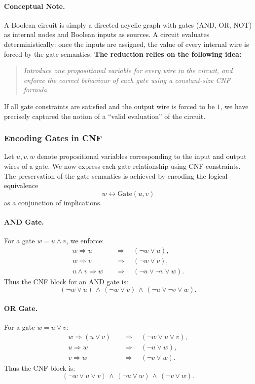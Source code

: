 \documentclass[9pt]{extarticle}
\begin{document}
\paragraph{Conceptual Note.}
A Boolean circuit is simply a directed acyclic graph with gates
(\textsc{AND}, \textsc{OR}, \textsc{NOT}) as internal nodes and Boolean inputs
as sources.  A circuit evaluates deterministically: once the inputs are
assigned, the value of every internal wire is forced by the gate semantics.
\textbf{The reduction relies on the following idea:}
\begin{quote}
    \emph{Introduce one propositional variable for every wire in the circuit, and
    enforce the correct behaviour of each gate using a constant-size CNF
    formula.}
\end{quote}
If all gate constraints are satisfied and the output wire is forced to be $1$,
we have precisely captured the notion of a ``valid evaluation'' of the circuit.

\subsubsection*{Encoding Gates in CNF}

Let $u, v, w$ denote propositional variables corresponding to the input and
output wires of a gate.  We now express each gate relationship using CNF
constraints.  The preservation of the gate semantics is achieved by encoding the
logical equivalence
\[
    w \leftrightarrow \text{Gate}(u,v)
\]
as a conjunction of implications.

\paragraph{AND Gate.}
For a gate $w = u \land v$, we enforce:
\[
\begin{aligned}
w \Rightarrow u &\quad\Rightarrow\quad (\neg w \lor u),\\
w \Rightarrow v &\quad\Rightarrow\quad (\neg w \lor v),\\
u \land v \Rightarrow w &\quad\Rightarrow\quad (\neg u \lor \neg v \lor w).
\end{aligned}
\]
Thus the CNF block for an \textsc{AND} gate is:
\[
(\neg w \lor u)\,\land\,(\neg w \lor v)\,\land\,(\neg u \lor \neg v \lor w).
\]

\paragraph{OR Gate.}
For a gate $w = u \lor v$:
\[
\begin{aligned}
w \Rightarrow (u \lor v) &\quad\Rightarrow\quad (\neg w \lor u \lor v),\\
u \Rightarrow w &\quad\Rightarrow\quad (\neg u \lor w),\\
v \Rightarrow w &\quad\Rightarrow\quad (\neg v \lor w).
\end{aligned}
\]
Thus the CNF block is:
\[
(\neg w \lor u \lor v)\,\land\,(\neg u \lor w)\,\land\,(\neg v \lor w).
\]
\end{document}

